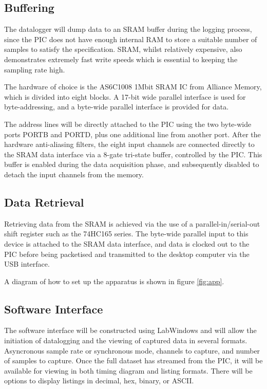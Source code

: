 \documentclass[11pt]{article}
\begin{document}
\subsection{Buffering}
    The datalogger will dump data to an SRAM buffer during the logging process,
    since the PIC does not have enough internal RAM to store a suitable number
    of samples to satisfy the specification. SRAM, whilst relatively expensive,
    also demonstrates extremely fast write speeds which is essential to keeping
    the sampling rate high.

    The hardware of choice is the AS6C1008 1Mbit SRAM IC from Alliance Memory, 
    which is divided into eight blocks. A 17-bit wide parallel interface is 
    used for byte-addressing, and a byte-wide parallel interface is provided 
    for data.

    The address lines will be directly attached to the PIC using the two
    byte-wide ports PORTB and PORTD, plus one additional line from another port.
    After the hardware anti-aliasing filters, the eight input channels are
    connected directly to the SRAM data interface via a 8-gate tri-state 
    buffer, controlled by the PIC. This buffer is enabled during the data
    acquisition phase, and subsequently disabled to detach the input channels
    from the memory.

\subsection{Data Retrieval}
    Retrieving data from the SRAM is achieved via the use of a
    parallel-in/serial-out shift register such as the 74HC165 series. The
    byte-wide parallel input to this device is attached to the SRAM data
    interface, and data is clocked out to the PIC before being packetised and
    transmitted to the desktop computer via the USB interface.

    A diagram of how to set up the apparatus is shown in figure \ref{fig:app}.
    
\subsection{Software Interface}
    The software interface will be constructed using LabWindows and will allow
    the initiation of datalogging and the viewing of captured data in several
    formats.  Asyncronous sample rate or synchronous mode, channels to
    capture, and number of samples to capture.  Once the full dataset has
    streamed from the PIC, it will be available for viewing in both timing diagram
    and listing formats.  There will be options to display listings in decimal, hex,
    binary, or ASCII.
    
\end{document}
